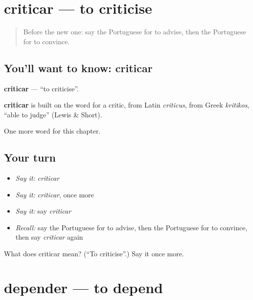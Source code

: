 \section[criticar]{criticar — to criticise}

\label{lesson:PT-C234-criticar}



\begin{quote}
Before the new one: say the Portuguese for to advise, then the Portuguese for to convince.
\end{quote}

\subsection*{You'll want to know: criticar}
\textbf{criticar} — \textquotedblleft{}to criticise\textquotedblright{}.

\begin{cousinweb}
\textbf{criticar} is built on the word for a critic, from Latin \emph{criticus}, from Greek \emph{kritikos}, \textquotedblleft{}able to judge\textquotedblright{} (Lewis \& Short).
\end{cousinweb}

\begin{grammarlens}[title={What you've built}]
One more word for this chapter.
\end{grammarlens}

\subsection*{Your turn}
\begin{itemize}
\raggedright
  \item \emph{Say it:} \emph{criticar}
  \item \emph{Say it:} \emph{criticar}, once more
  \item \emph{Say it:} say \emph{criticar}
  \item \emph{Recall:} say the Portuguese for to advise, then the Portuguese for to convince, then say \emph{criticar} again
\end{itemize}

\begin{tcolorbox}[breakable,colback=teal!4,colframe=teal!35!black,title={Before you move on}]
What does criticar mean? (\textquotedblleft{}To criticise\textquotedblright{}.) Say it once more.
\end{tcolorbox}
\section[depender]{depender — to depend}

